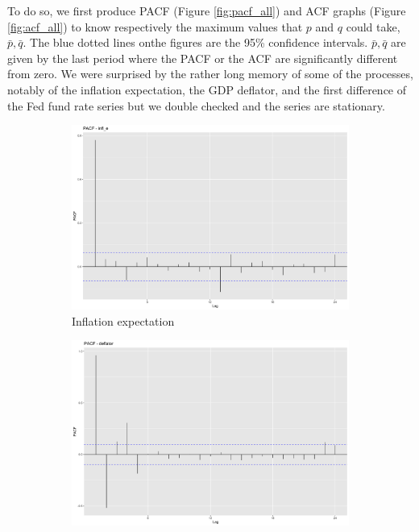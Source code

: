 \documentclass[hidelinks,12pts]{article}
\DeclareMathOperator{\1}{\mathbbm{1}}
\begin{document}
To do so, we first produce PACF (Figure \ref{fig:pacf_all}) and ACF graphs (Figure \ref{fig:acf_all}) to know respectively the maximum values that $p$ and $q$ could take, $\bar{p}, \bar{q}$.
The blue dotted lines onthe figures are the 95\% confidence intervals.
$\bar{p}, \bar{q}$ are given by the last period where the PACF or the ACF are significantly different from zero. 
We were surprised by the rather long memory of some of the processes, notably of the inflation expectation, the GDP deflator, and the first difference of the Fed fund rate series but we double checked and the series are stationary. 

\begin{figure}[h!]
    \centering
    \begin{subfigure}[b]{0.45\textwidth}
        \centering
        \includegraphics[width=\textwidth]{IMAGES/pacf_infl.png}
        \caption*{Inflation expectation}
    \end{subfigure}
    \hfill
    \begin{subfigure}[b]{0.45\textwidth}
        \centering
        \includegraphics[width=\textwidth]{IMAGES/pacf_defl.png}

\end{subfigure}
\end{figure}
\end{document}
